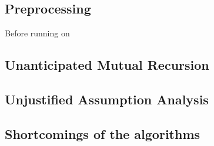 \subsection{Preprocessing}
Before running on


\subsection{Unanticipated Mutual Recursion}

\subsection{Unjustified Assumption Analysis}

\subsection{Shortcomings of the algorithms}
